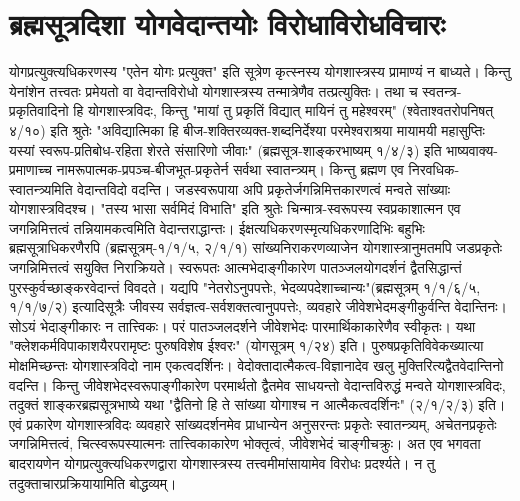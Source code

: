 \section*{ब्रह्मसूत्रदिशा योगवेदान्तयोः विरोधाविरोधविचारः}

योगप्रत्युक्त्यधिकरणस्य "एतेन योगः प्रत्युक्त" इति सूत्रेण कृत्स्नस्य योगशास्त्रस्य प्रामाण्यं न बाध्यते। किन्तु येनांशेन तत्त्वतः प्रमेयतो वा वेदान्तविरोधो योगशास्त्रस्य तन्मात्रेणैव तत्प्रत्युक्तिः। तथा च स्वतन्त्र-प्रकृतिवादिनो हि योगशास्त्रविदः, किन्तु "मायां तु प्रकृतिं विद्यात् मायिनं तु महेश्वरम्" (श्वेताश्वतरोपनिषत् ४/१०) इति श्रुतेः "अविद्यात्मिका हि बीज-शक्तिरव्यक्त-शब्दनिर्देश्या परमेश्वराश्रया मायामयी महासुप्तिः यस्यां स्वरूप-प्रतिबोध-रहिता शेरते संसारिणो जीवाः" (ब्रह्मसूत्र-शाङ्करभाष्यम् १/४/३) इति भाष्यवाक्य-प्रमाणाच्च नामरूपात्मक-प्रपञ्च-बीजभूत-प्रकृतेर्न सर्वथा स्वातन्त्र्यम्। किन्तु ब्रह्मण एव निरवधिक-स्वातन्त्र्यमिति वेदान्तविदो वदन्ति। जडस्वरूपाया अपि प्रकृतेर्जगन्निमित्तकारणत्वं मन्वते सांख्याः योगशास्त्रविदश्च। "तस्य भासा सर्वमिदं विभाति" इति श्रुतेः चिन्मात्र-स्वरूपस्य स्वप्रकाशात्मन एव जगन्निमित्तत्वं तन्नियामकत्वमिति वेदान्तराद्धान्तः। ईक्षत्यधिकरणस्मृत्यधिकरणादिभिः बहुभिः ब्रह्मसूत्राधिकरणैरपि (ब्रह्मसूत्रम्-१/१/५, २/१/१) सांख्यनिराकरणव्याजेन योगशास्त्रानुमतमपि जडप्रकृतेः जगन्निमित्तत्वं सयुक्ति निराक्रियते। स्वरूपतः आत्मभेदाङ्गीकारेण पातञ्जलयोगदर्शनं द्वैतसिद्धान्तं पुरस्कुर्वच्छाङ्करवेदान्तं विवदते। यद्यपि "नेतरोऽनुपपत्तेः, भेदव्यपदेशाच्चान्यः"(ब्रह्मसूत्रम् १/१/६/५, १/१/७/२) इत्यादिसूत्रैः जीवस्य सर्वज्ञत्व-सर्वशक्तत्वानुपपत्तेः, व्यवहारे जीवेशभेदमङ्गीकुर्वन्ति वेदान्तिनः। सोऽयं भेदाङ्गीकारः न तात्त्विकः। परं पातञ्जलदर्शने जीवेशभेदः पारमार्थिकाकारेणैव स्वीकृतः। यथा "क्लेशकर्मविपाकाशयैरपरामृष्टः पुरुषविशेष ईश्वरः" (योगसूत्रम् १/२४) इति। पुरुषप्रकृतिविवेकख्यात्या मोक्षमिच्छन्तः योगशास्त्रविदो नाम एकत्वदर्शिनः। वेदोक्तादात्मैकत्व-विज्ञानादेव खलु मुक्तिरित्यद्वैतवेदान्तिनो वदन्ति। किन्तु जीवेशभेदस्वरूपाङ्गीकारेण परमार्थतो द्वैतमेव साधयन्तो वेदान्तविरुद्धं मन्वते योगशास्त्रविदः, तदुक्तं शाङ्करब्रह्मसूत्रभाष्ये यथा "द्वैतिनो हि ते सांख्या योगाश्च न आत्मैकत्वदर्शिनः" (२/१/२/३) इति। एवं प्रकारेण योगशास्त्रविदः व्यवहारे सांख्यदर्शनमेव प्राधान्येन अनुसरन्तः प्रकृतेः स्वातन्त्र्यम्, अचेतनप्रकृतेः जगन्निमित्तत्वं, चित्स्वरूपस्यात्मनः तात्त्विकाकारेण भोक्तृत्वं, जीवेशभेदं चाङ्गीचक्रुः। अत एव भगवता बादरायणेन योगप्रत्युक्त्यधिकरणद्वारा योगशास्त्रस्य तत्त्वमीमांसायामेव विरोधः प्रदर्श्यते। न तु तदुक्ताचारप्रक्रियायामिति बोद्धव्यम्।

